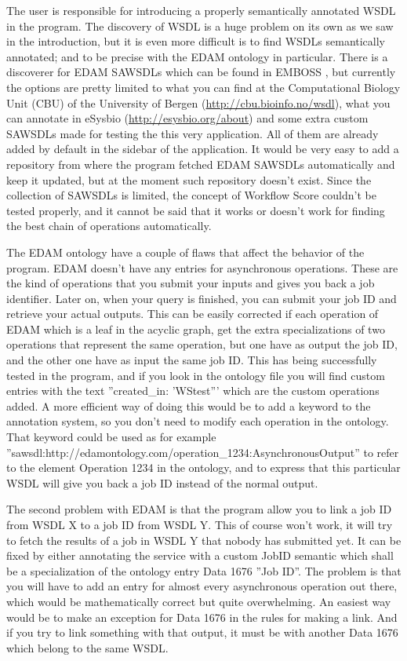 \documentclass[a4paper,10pt]{article}
\begin{document}
  The user is responsible for introducing a properly semantically annotated WSDL in the program. The discovery of WSDL is a huge problem on its own as we saw in the introduction, but it is even more difficult is to find WSDLs semantically annotated; and to be precise with the EDAM ontology in particular. There is a discoverer for EDAM SAWSDLs which can be found in EMBOSS \cite{emboss}, but currently the options are pretty limited to what you can find at the Computational Biology Unit (CBU) of the University of Bergen (\url{http://cbu.bioinfo.no/wsdl}), what you can annotate in eSysbio (\url{http://esysbio.org/about}) and some extra custom SAWSDLs made for testing the this very application. All of them are already added by default in the sidebar of the application. It would be very easy to add a repository from where the program fetched EDAM SAWSDLs automatically and keep it updated, but at the moment such repository doesn't exist. Since the collection of SAWSDLs is limited, the concept of Workflow Score couldn't be tested properly, and it cannot be said that it works or doesn't work for finding the best chain of operations automatically.\vspace{3 mm}

  The EDAM ontology have a couple of flaws that affect the behavior of the program. EDAM doesn't have any entries for asynchronous operations. These are the kind of operations that you submit your inputs and gives you back a job identifier. Later on, when your query is finished, you can submit your job ID and retrieve your actual outputs. This can be easily corrected if each operation of EDAM which is a leaf in the acyclic graph, get the extra specializations of two operations that represent the same operation, but one have as output the job ID, and the other one have as input the same job ID. This has being successfully tested in the program, and if you look in the ontology file you will find custom entries with the text ''created\_in: 'WStest''' which are the custom operations added. A more efficient way of doing this would be to add a keyword to the annotation system, so you don't need to modify each operation in the ontology. That keyword could be used as for example ''sawsdl:http://edamontology.com/operation\_1234:AsynchronousOutput'' to refer to the element Operation 1234 in the ontology, and to express that this particular WSDL will give you back a job ID instead of the normal output. \vspace{3 mm}

  The second problem with EDAM is that the program allow you to link a job ID from WSDL X to a job ID from WSDL Y. This of course won't work, it will try to fetch the results of a job in WSDL Y that nobody has submitted yet. It can be fixed by either annotating the service with a custom JobID semantic which shall be a specialization of the ontology entry Data 1676 ''Job ID''. The problem is that you will have to add an entry for almost every asynchronous operation out there, which would be mathematically correct but quite overwhelming. An easiest way would be to make an exception for Data 1676 in the rules for making a link. And if you try to link something with that output, it must be with another Data 1676 which belong to the same WSDL. \vspace{3 mm}
\end{document}
